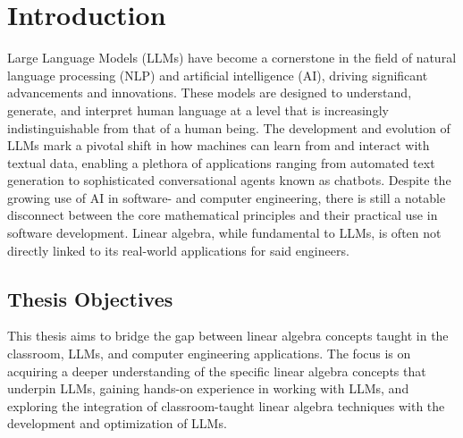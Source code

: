 
\chapter{Introduction}

Large Language Models (LLMs) have become a cornerstone in the field of natural language processing (NLP) and artificial intelligence (AI), driving significant advancements and innovations. These models are designed to understand, generate, and interpret human language at a level that is increasingly indistinguishable from that of a human being. The development and evolution of LLMs mark a pivotal shift in how machines can learn from and interact with textual data, enabling a plethora of applications ranging from automated text generation to sophisticated conversational agents known as chatbots.
Despite the growing use of AI in software- and computer engineering, there is still a notable disconnect between the core mathematical principles and their practical use in software development. Linear algebra, while fundamental to LLMs, is often not directly linked to its real-world applications for said engineers.

\section{Thesis Objectives}

This thesis aims to bridge the gap between linear algebra concepts taught in the classroom, LLMs, and computer engineering applications. The focus is on acquiring a deeper understanding of the specific linear algebra concepts that underpin LLMs, gaining hands-on experience in working with LLMs, and exploring the integration of classroom-taught linear algebra techniques with the development and optimization of LLMs.

